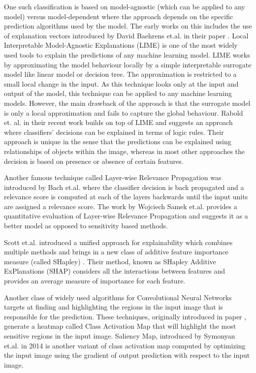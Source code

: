 \documentclass{JMLFS}
\begin{document}
One such classification is based on model-agnostic (which can be applied to any model) versus model-dependent where the approach depends on the specific prediction algorithms used by the model.
The early works on this includes the use of explanation vectors introduced by David Baehrens et.al. in their paper \cite{baehrens2010explain}.
Local Interpretable Model-Agnostic Explanations (LIME) \cite{ribeiro2016should} is one of the most widely used tools to explain the predictions of any machine learning model.
LIME works by approximating the model behaviour locally by a simple interpretable surrogate model like linear model or decision tree. The approximation is restricted to a small local change in the input. As this technique looks only at the input and output of the model, this technique can be applied to any machine learning models.
However, the main drawback of the approach is that the surrogate model is only a local approximation and fails to capture the global behaviour.
Rabold et. al. in their recent work \cite{rabold2019enriching} builds on top of LIME and suggests an approach where classifiers' decisions can be explained in terms of logic rules. Their approach is unique in the sense that the predictions can be explained using relationships of objects within the image, whereas in most other approaches the decision is based on presence or absence of certain features.

Another famous technique called Layer-wise Relevance Propagation was introduced by Bach et.al. \cite{bach2015pixel} where the classifier decision is  back propagated and a relevance score is computed at each of the layers backwards until the input units are assigned a relevance score.
The work by Wojciech Samek et.al. \cite{samek2016evaluating} provides a quantitative  evaluation of Layer-wise Relevance Propagation and  suggests it as a better model as opposed to sensitivity based methods.

Scott et.al. introduced a unified approach for explainability which combines multiple methods and brings in a new class of additive feature importance measure (called SHapley) \cite{lundberg2017unified}.
Their method, known as SHapley Additive ExPlanations (SHAP) considers all  the interactions between features and provides an average measure of importance for each feature.

Another class of widely used algorithms for  Convolutional Neural Networks  targets at finding and highlighting the  regions in the input image that is responsible for the prediction.
These techniques, originally introduced in paper \cite{zhou2016learning}, generate a heatmap called Class Activation Map that will highlight the most sensitive regions in the input image.
Saliency Map, introduced by Symonyan et.al. in 2014 \cite{simonyan2014deep} is another variant of class activation map computed by optimizing the input image using the gradient of output prediction with respect to the input image.
\end{document}
